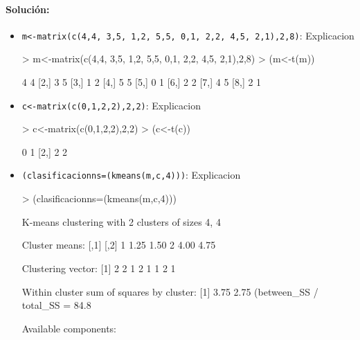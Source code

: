 \documentclass[a4paper, 12pt]{article}
\begin{document}
	\paragraph{Solución:}
	\begin{itemize}
		\item \texttt{m<-matrix(c(4,4, 3,5, 1,2, 5,5, 0,1, 2,2, 4,5, 2,1),2,8)}: 
		Explicacion
\begin{Schunk}
\begin{Sinput}
> m<-matrix(c(4,4, 3,5, 1,2, 5,5, 0,1, 2,2, 4,5, 2,1),2,8)
> (m<-t(m))
\end{Sinput}
\begin{Soutput}
     [,1] [,2]
[1,]    4    4
[2,]    3    5
[3,]    1    2
[4,]    5    5
[5,]    0    1
[6,]    2    2
[7,]    4    5
[8,]    2    1
\end{Soutput}
\end{Schunk}
		\item \texttt{c<-matrix(c(0,1,2,2),2,2)}: 
		Explicacion
\begin{Schunk}
\begin{Sinput}
> c<-matrix(c(0,1,2,2),2,2)
> (c<-t(c))
\end{Sinput}
\begin{Soutput}
     [,1] [,2]
[1,]    0    1
[2,]    2    2
\end{Soutput}
\end{Schunk}
		\item \texttt{(clasificacionns=(kmeans(m,c,4)))}: 
		Explicacion
\begin{Schunk}
\begin{Sinput}
> (clasificacionns=(kmeans(m,c,4)))
\end{Sinput}
\begin{Soutput}
K-means clustering with 2 clusters of sizes 4, 4

Cluster means:
  [,1] [,2]
1 1.25 1.50
2 4.00 4.75

Clustering vector:
[1] 2 2 1 2 1 1 2 1

Within cluster sum of squares by cluster:
[1] 3.75 2.75
 (between_SS / total_SS =  84.8 %

Available components:


\end{Soutput}
\end{Schunk}
\end{itemize}
\end{document}
